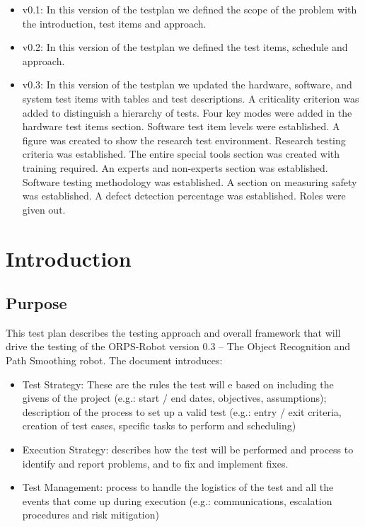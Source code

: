 \documentclass[english,12pt]{article}
\begin{document}
\begin{itemize}
	\item v0.1: In this version of the testplan we defined the  
    scope of the problem with the introduction, test items and 
    approach.
    \item v0.2: In this version of the testplan we defined the  
    test items, schedule and approach.
    \item v0.3: In this version of the testplan we updated 
    the hardware, software, and system test items with 
    tables and test descriptions. A criticality criterion 
    was added to distinguish a hierarchy of tests. Four key 
    modes were added in the hardware test items section. 
    Software test item levels were established. A figure 
    was created to show the research test environment. 
    Research testing criteria was established. The entire 
    special tools section was created with training required.
    An experts and non-experts section was established.
    Software testing methodology was established.
    A section on measuring safety was established.
    A defect detection percentage was established.
    Roles were given out.
\end{itemize}


\section{Introduction}
\subsection{Purpose}
This test plan describes the testing approach and overall 
framework that will drive the testing of the ORPS-Robot 
version 0.3 – The Object Recognition and Path Smoothing 
robot. The document introduces:
\begin{itemize}
	\item[] Test Strategy: These are the rules the test will e based on including 
    the givens of the project (e.g.: start / end dates, objectives, assumptions); 
    description of the process to set up a valid test (e.g.: entry / exit criteria, 
    creation of test cases, specific tasks to perform and scheduling)
	\item[] Execution Strategy: describes how the test will be performed 
    and process to identify and report problems, and to fix and implement 
    fixes.
    \item[] Test Management: process to handle the logistics of the test 
    and all the events that come up during execution (e.g.: communications, 
    escalation procedures and risk mitigation)
\end{itemize}
\end{document}
